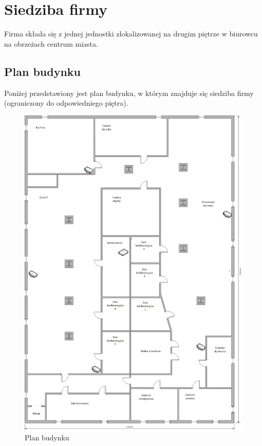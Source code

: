 \documentclass{article}
\begin{document}
    \newpage
    \section{Siedziba firmy}
        Firma składa się z jednej jednostki zlokalizowanej na drugim piętrze w biurowcu na obrzeżach centrum miasta.
        \subsection{Plan budynku}
            Poniżej przedstawiony jest plan budynku, w którym znajduje się siedziba firmy (ograniczony do odpowiedniego piętra).
            \begin{figure}[H]
                \centering
                \includegraphics[width=1.0\linewidth]{assets/plan_budynku.png}
                \caption{Plan budynku}
            \end{figure}
\end{document}
